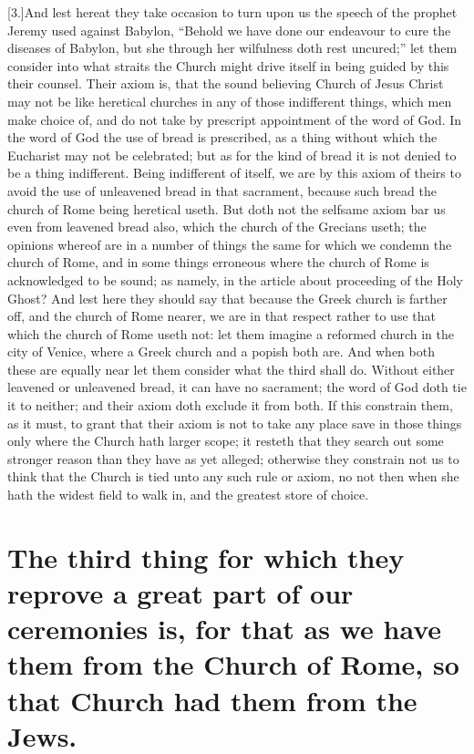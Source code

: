 [3.]And lest hereat they take occasion to turn upon us the speech of the prophet Jeremy used against Babylon, “Behold we have done our endeavour to cure the diseases of Babylon, but she through her wilfulness doth rest uncured;” let them consider into what straits the Church might drive itself in being guided by this their counsel. Their axiom is, that the sound believing Church of Jesus Christ may not be like heretical churches in any of those indifferent things, which men make choice of, and do not take by prescript appointment of the word of God. In the word of God the use of bread is prescribed, as a thing without which the Eucharist may not be celebrated; but as for the kind of bread it is not denied to be a thing indifferent. Being indifferent of itself, we are by this axiom of theirs to avoid the use of unleavened bread in that sacrament, because such bread the church of Rome being heretical useth. But doth not the selfsame axiom bar us even from leavened bread also, which the church of the Grecians useth; the opinions whereof are in a number of things the same for which we condemn the church of Rome, and in some things erroneous where the church of Rome is acknowledged to be sound; as namely, in the article about proceeding of the Holy Ghost? And lest here they should say that because the Greek church is farther off, and the church of Rome nearer, we are in that respect rather to use that which the church of Rome useth not: let them imagine a reformed church in the city of Venice, where a Greek church and a popish both are. And when both these are equally near let them consider what the third shall do. Without either leavened or unleavened bread, it can have no sacrament; the word of God doth tie it to neither; and their axiom doth exclude it from both. If this constrain them, as it must, to grant that their axiom is not to take any place save in those things only where the Church hath larger scope; it resteth that they search out some stronger reason than they have as yet alleged; otherwise they constrain not us to think that the Church is tied unto any such rule or axiom, no not then when  she hath the widest field to walk in, and the greatest store of choice.

\section*{The third thing for which they reprove a great part of our ceremonies is, for that as we have them from the Church of Rome, so that Church had them from the Jews.}

